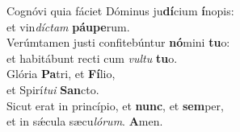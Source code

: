 \oddverse Cognóvi quia fáciet Dóminus ju\textbf{dí}cium \textbf{í}nopis:~\*\\
\oddverse et vin\textit{dí}\textit{ctam} \textbf{páu}\textbf{pe}rum.\\
\evenverse Verúmtamen justi confitebúntur \textbf{nó}mini \textbf{tu}o:~\*\\
\evenverse et habitábunt recti cum \textit{vul}\textit{tu} \textbf{tu}o.\\
\oddverse Glória \textbf{Pa}tri, et \textbf{Fí}lio,~\*\\
\oddverse et Spirí\textit{tu}\textit{i} \textbf{San}cto.\\
\evenverse Sicut erat in princípio, et \textbf{nunc}, et \textbf{sem}per,~\*\\
\evenverse et in sǽcula sæcu\textit{ló}\textit{rum}. \textbf{A}men.\\
